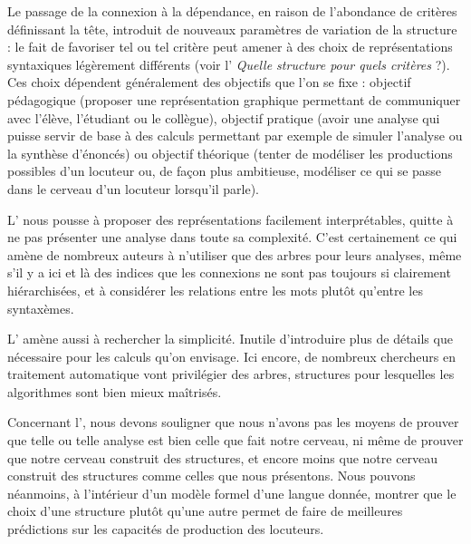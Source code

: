 Le passage de la connexion à la dépendance, en raison de l’abondance de critères définissant la tête, introduit de nouveaux paramètres de variation de la structure : le fait de favoriser tel ou tel critère peut amener à des choix de représentations syntaxiques légèrement différents (voir l’ \textit{Quelle structure pour quels critères} ?). Ces choix dépendent généralement des objectifs que l'on se fixe : objectif pédagogique (proposer une représentation graphique permettant de communiquer avec l’élève, l’étudiant ou le collègue), objectif pratique (avoir une analyse qui puisse servir de base à des calculs permettant par exemple de simuler l’analyse ou la synthèse d’énoncés) ou objectif théorique (tenter de modéliser les productions possibles d'un locuteur ou, de façon plus ambitieuse, modéliser ce qui se passe dans le cerveau d’un locuteur lorsqu’il parle).

L’ nous pousse à proposer des représentations facilement interprétables, quitte à ne pas présenter une analyse dans toute sa complexité. C’est certainement ce qui amène de nombreux auteurs à n’utiliser que des arbres pour leurs analyses, même s’il y a ici et là des indices que les connexions ne sont pas toujours si clairement hiérarchisées, et à considérer les relations entre les mots plutôt qu'entre les syntaxèmes.

L’ amène aussi à rechercher la simplicité. Inutile d’introduire plus de détails que nécessaire pour les calculs qu’on envisage. Ici encore, de nombreux chercheurs en traitement automatique vont privilégier des arbres, structures pour lesquelles les algorithmes sont bien mieux maîtrisés.

Concernant l', nous devons souligner que nous n’avons pas les moyens de prouver que telle ou telle analyse est bien celle que fait notre cerveau, ni même de prouver que notre cerveau construit des structures, et encore moins que notre cerveau construit des structures comme celles que nous présentons. Nous pouvons néanmoins, à l’intérieur d’un modèle formel d’une langue donnée, montrer que le choix d’une structure plutôt qu’une autre permet de faire de meilleures prédictions sur les capacités de production des locuteurs.


